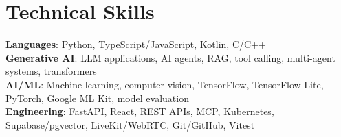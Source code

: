 \documentclass[letterpaper,11pt]{article}
\begin{document}
\section{Technical Skills}
 \begin{itemize}[leftmargin=0.15in, label={}]
    \small{\item{
     \textbf{Languages}{: Python, TypeScript/JavaScript, Kotlin, C/C++} \\
     \textbf{Generative AI}{: LLM applications, AI agents, RAG, tool calling, multi-agent systems, transformers} \\
     \textbf{AI/ML}{: Machine learning, computer vision, TensorFlow, TensorFlow Lite, PyTorch, Google ML Kit, model evaluation} \\
     \textbf{Engineering}{: FastAPI, React, REST APIs, MCP, Kubernetes, Supabase/pgvector, LiveKit/WebRTC, Git/GitHub, Vitest} \\
    }}
 \end{itemize}
 \vspace{-16pt}
\end{document}

